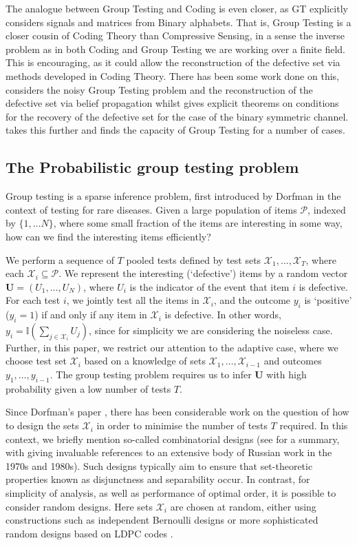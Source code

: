 \documentclass[conference]{IEEEtran}
\newcommand{\vc}[1]{{\mathbf{ #1}}}
\newcommand{\II}{{\mathbb{I}}}
\newcommand{\setP}{{\mathcal{P}}}
\newcommand{\setX}{{\mathcal{X}}}
\begin{document}
The analogue between Group Testing and Coding is even closer, as GT explicitly considers signals and matrices from Binary alphabets. That is, Group Testing is a closer cousin of Coding Theory than Compressive Sensing, in a sense the inverse problem as in both Coding and Group Testing we are working over a finite field. This is encouraging, as it could allow the reconstruction of the defective set via methods developed in Coding Theory. There has been some work done on this, \cite{Sejdinovic2010} considers the noisy Group Testing problem and the reconstruction of the defective set via belief propagation whilst \cite{Wadayama2013} gives explicit theorems on conditions for the recovery of the defective set for the case of the binary symmetric channel. \cite{Baldassini2013} takes this further and finds the capacity of Group Testing for a number of cases. 

\subsection{The Probabilistic group testing problem}
Group testing is a sparse inference problem, first introduced by Dorfman \cite{dorfman} in the context of testing for rare diseases.
Given  a large population of items \(\setP\),
indexed by \( \{1, \ldots N\}\), where
some small fraction of the items are interesting in some way, how can we find the interesting items efficiently? 

We perform a sequence of $T$ pooled tests defined by test sets $\setX_1, \ldots, \setX_T$, where each $\setX_i \subseteq \setP$. 
We represent the interesting (`defective') items by 
a random vector $\vc{U} = ( U_1, \ldots, U_N)$, where $U_i$ is the indicator of the event that item $i$ is defective. 
For each test $i$, we jointly 
test all the items in $\setX_i$, and the outcome $y_i$ is `positive' ($y_i = 1$) if and only if any item in $\setX_i$ is defective. In other words, 
$y_i = \II \left( \sum_{j \in \setX_i} U_j \right)$, since for simplicity we are  considering the noiseless case. Further, in this paper, we restrict our attention to
 the adaptive case, where we choose test set
$\setX_i$ based on a knowledge of sets $\setX_1, \ldots, \setX_{i-1}$ and outcomes $y_1, \ldots, y_{i-1}$. The group testing problem requires us to infer $\vc{U}$ with high
probability given a low number of tests $T$.

Since Dorfman's paper \cite{dorfman}, there has been considerable work on the question of how to design the sets $\setX_i$ in order to minimise the number of tests $T$
required. In this context, we briefly mention so-called combinatorial designs (see \cite{du, malyutov} for a summary, with \cite{malyutov} giving invaluable
references to an extensive body of Russian work in the 1970s and 1980s). Such designs typically aim to ensure that 
set-theoretic properties known as disjunctness
and separability occur. In contrast, for simplicity of analysis, as well as  performance of optimal order, it is possible to consider random designs. Here sets $\setX_i$ are chosen
at random, either using constructions such as independent Bernoulli designs \cite{atia, johnsonc8, johnson33} or more sophisticated  random designs based on LDPC codes \cite{wadayama}. 
\end{document}
